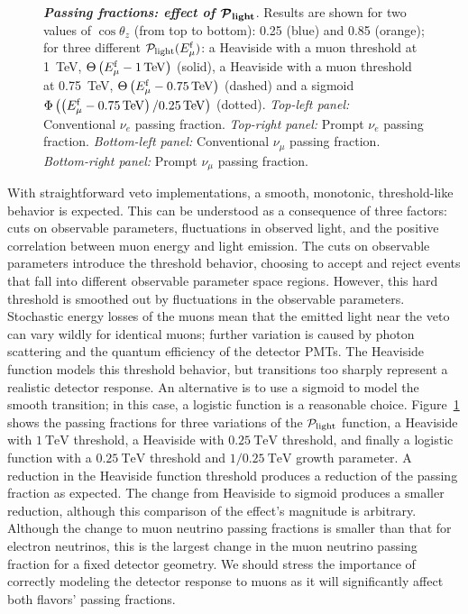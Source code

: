 \begin{figure}[h!]
{	}
	\caption{\textbf{\textit{Passing fractions: effect of $\boldsymbol{{\mathcal P}_{\rm light}}$}}. Results are shown for two values of $\cos\theta_z$ (from top to bottom): 0.25 (blue) and 0.85 (orange); for three different ${\mathcal P}_{\rm light}(E_{\mu}^{\rm f})$: a Heaviside with a muon threshold at 1~TeV, $\Theta\left(E_{\mu}^{\rm f} - 1 \, {\rm TeV}\right)$ (solid), a Heaviside with a muon threshold at 0.75~TeV, $\Theta\left(E_{\mu}^{\rm f} - 0.75 \, {\rm TeV}\right)$ (dashed) and a sigmoid $\Phi\left(\left(E_{\mu}^{\rm f} - 0.75 \, {\rm TeV}\right)/0.25 \, {\rm TeV}\right)$ (dotted). \textit{Top-left panel:} Conventional $\nu_e$ passing fraction. \textit{Top-right panel:} Prompt $\nu_e$ passing fraction. \textit{Bottom-left panel:} Conventional $\nu_\mu$ passing fraction. \textit{Bottom-right panel:} Prompt $\nu_\mu$ passing fraction.} \vspace{1.5cm}
	\label{fig:nue-plight-effect}
\end{figure}

With straightforward veto implementations, a smooth, monotonic, threshold-like behavior is expected.
This can be understood as a consequence of three factors: cuts on observable parameters, fluctuations in observed light, and the positive correlation between muon energy and light emission.
The cuts on observable parameters introduce the threshold behavior, choosing to accept and reject events that fall into different observable parameter space regions.
However, this hard threshold is smoothed out by fluctuations in the observable parameters.
Stochastic energy losses of the muons mean that the emitted light near the veto can vary wildly for identical muons; further variation is caused by photon scattering and the quantum efficiency of the detector PMTs.
The Heaviside function models this threshold behavior, but transitions too sharply represent a realistic detector response.
An alternative is to use a sigmoid to model the smooth transition; in this case, a logistic function is a reasonable choice.
Figure~\ref{fig:nue-plight-effect} shows the passing fractions for three variations of the ${\mathcal P}_{\rm light}$ function, a Heaviside with $\SI{1}\TeV$ threshold, a Heaviside with $\SI{0.25}\TeV$ threshold, and finally a logistic function with a $\SI{0.25}\TeV$ threshold and $1/\SI{0.25}\TeV$ growth parameter.
A reduction in the Heaviside function threshold produces a reduction of the passing fraction as expected.
The change from Heaviside to sigmoid produces a smaller reduction, although this comparison of the effect's magnitude is arbitrary.
Although the change to muon neutrino passing fractions is smaller than that for electron neutrinos, this is the largest change in the muon neutrino passing fraction for a fixed detector geometry.
We should stress the importance of correctly modeling the detector response to muons as it will significantly affect both flavors' passing fractions.

